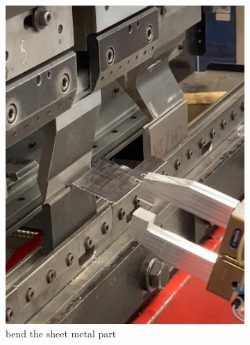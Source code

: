 \begin{figure}[h]
\begin{subfigure}[b]{0.32\textwidth}
        \includegraphics[width=\textwidth]{figures/bending/bending3-002.png}
        \caption{bend the sheet metal part}
        \label{subfig:bending3}
    \end{subfigure}\hspace{0.1cm}
    \begin{subfigure}[b]{0.32\textwidth}
        \centering

\end{subfigure}
\end{figure}
